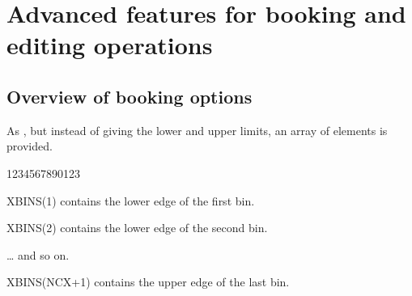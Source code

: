  
\chapter{Advanced features for booking and editing operations}
\label{HEDITING}
 
\section{Overview of booking options}

 
 
\Action As , but instead of giving the lower and upper limits,
        an array  of  elements is provided.
 
\begin{DLtt}{1234567890123}
\item[XBINS(1)] contains the lower edge of the first bin.
\item[XBINS(2)] contains the lower edge of the second bin.
\item[\quad\ldots] and so on.
\item[XBINS(NCX+1)] contains the upper edge of the last bin.
\end{DLtt}
 
 
 
